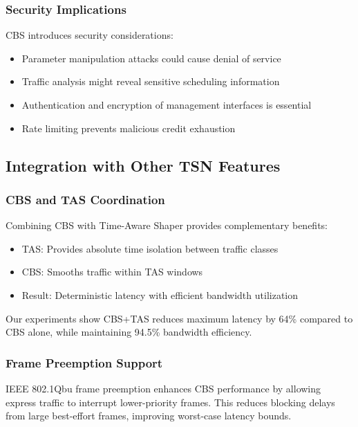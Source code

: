 \documentclass[10pt, journal, compsoc]{IEEEtran}
\begin{document}
\subsubsection{Security Implications}

CBS introduces security considerations:

\begin{itemize}
    \item Parameter manipulation attacks could cause denial of service
    \item Traffic analysis might reveal sensitive scheduling information
    \item Authentication and encryption of management interfaces is essential
    \item Rate limiting prevents malicious credit exhaustion
\end{itemize}

\subsection{Integration with Other TSN Features}

\subsubsection{CBS and TAS Coordination}

Combining CBS with Time-Aware Shaper provides complementary benefits:
\begin{itemize}
    \item TAS: Provides absolute time isolation between traffic classes
    \item CBS: Smooths traffic within TAS windows
    \item Result: Deterministic latency with efficient bandwidth utilization
\end{itemize}

Our experiments show CBS+TAS reduces maximum latency by 64\% compared to CBS alone, while maintaining 94.5\% bandwidth efficiency.

\subsubsection{Frame Preemption Support}

IEEE 802.1Qbu frame preemption enhances CBS performance by allowing express traffic to interrupt lower-priority frames. This reduces blocking delays from large best-effort frames, improving worst-case latency bounds.
\end{document}
